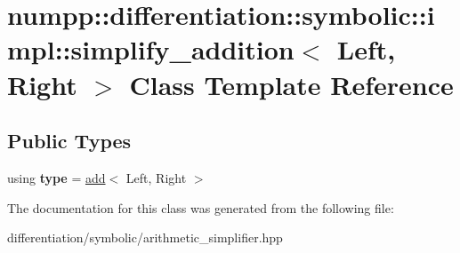 \hypertarget{classnumpp_1_1differentiation_1_1symbolic_1_1impl_1_1simplify__addition}{}\section{numpp\+:\+:differentiation\+:\+:symbolic\+:\+:impl\+:\+:simplify\+\_\+addition$<$ Left, Right $>$ Class Template Reference}
\label{classnumpp_1_1differentiation_1_1symbolic_1_1impl_1_1simplify__addition}
\subsection*{Public Types}
\begin{DoxyCompactItemize}
\item 
\mbox{\label{classnumpp_1_1differentiation_1_1symbolic_1_1impl_1_1simplify__addition_a7fa8f1b8446e9713d09bc58cf27318be}} 
using {\bfseries type} = \hyperlink{classnumpp_1_1differentiation_1_1symbolic_1_1add}{add}$<$ Left, Right $>$
\end{DoxyCompactItemize}


The documentation for this class was generated from the following file\+:\begin{DoxyCompactItemize}
\item 
differentiation/symbolic/arithmetic\+\_\+simplifier.\+hpp\end{DoxyCompactItemize}
